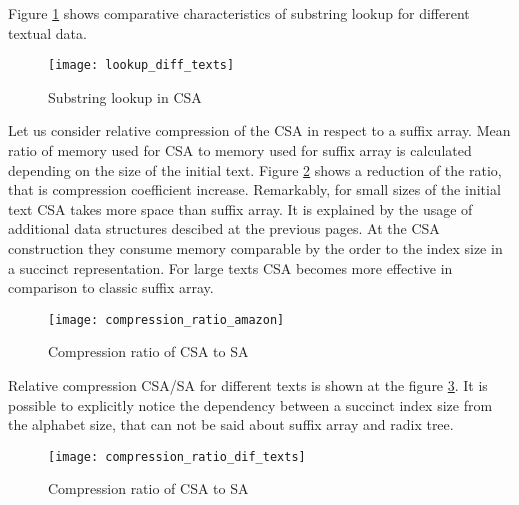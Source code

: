 Figure \ref{fig:CSA_Lookup_diff_texts} shows comparative characteristics of substring lookup
for different textual data.

\begin{figure}[h!]
    \centering
    \texttt{[image: lookup\_diff\_texts]}
    \caption{Substring lookup in CSA}
    \label{fig:CSA_Lookup_diff_texts}
\end{figure}

Let us consider relative compression of the CSA in respect to a suffix array.
Mean ratio of memory used for CSA to memory used for suffix array is calculated
depending on the size of the initial text. Figure \ref{fig:CSA_compression_ratio_amazon} shows
a reduction of the ratio, that is compression coefficient increase.
Remarkably, for small sizes of the initial text CSA takes more space than suffix array.
It is explained by the usage of additional data structures descibed at the previous pages.
At the CSA construction they consume memory comparable by the order to the index size
in a succinct representation. For large texts CSA becomes more effective in comparison to
classic suffix array.

\begin{figure}[h!]
    \centering
    \texttt{[image: compression\_ratio\_amazon]}
    \caption{Compression ratio of CSA to SA}
    \label{fig:CSA_compression_ratio_amazon}
\end{figure}

Relative compression CSA/SA for different texts is shown at the figure \ref{fig:CSA_compression_ratio_dif_texts}.
It is possible to explicitly notice the dependency between a succinct index size from the alphabet size,
that can not be said about suffix array and radix tree.

\begin{figure}[h!]
    \centering
    \texttt{[image: compression\_ratio\_dif\_texts]}
    \caption{Compression ratio of CSA to SA}
    \label{fig:CSA_compression_ratio_dif_texts}
\end{figure}
